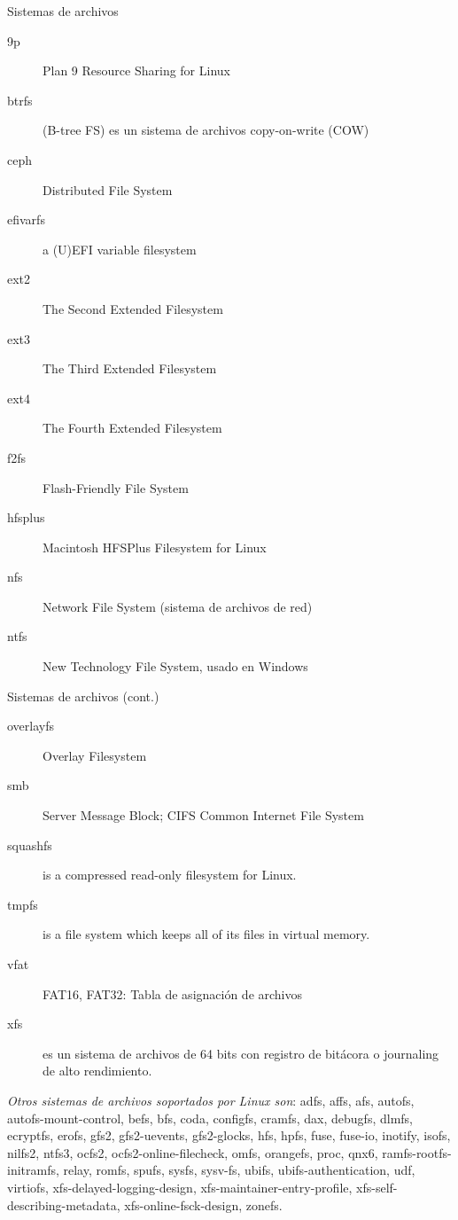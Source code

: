 \begin{frame}[c]{Sistemas de archivos}
  \pausa
  \begin{description}
    \item[9p] Plan 9 Resource Sharing for Linux
    \pausa
    \item[btrfs] (B-tree FS) es un sistema de archivos copy-on-write (COW) 
    \pausa
    \item[ceph] Distributed File System
    \pausa
    \item[efivarfs] a (U)EFI variable filesystem
    \pausa
    \item[ext2] The Second Extended Filesystem
    \pausa
    \item[ext3] The Third Extended Filesystem
    \pausa
    \item[ext4] The Fourth Extended Filesystem
    \pausa
    \item[f2fs] Flash-Friendly File System
    \pausa
    \item[hfsplus] Macintosh HFSPlus Filesystem for Linux
    \pausa
    \item[nfs] Network File System (sistema de archivos de red)
    \pausa
    \item[ntfs] New Technology File System, usado en Windows
  \end{description}
\end{frame}

\begin{frame}[c]{Sistemas de archivos (cont.)}
  \begin{description}
    \item[overlayfs] Overlay Filesystem
    \pausa
    \item[smb] Server Message Block; CIFS Common Internet File System
    \pausa
    \item[squashfs] is a compressed read-only filesystem for Linux.
    \pausa
    \item[tmpfs] is a file system which keeps all of its files in virtual memory.
    \pausa
    \item[vfat] FAT16, FAT32: Tabla de asignación de archivos
    \pausa
    \item[xfs]  es un sistema de archivos de 64 bits con registro de
      bitácora o journaling de alto rendimiento.
  \end{description}

  \vspace{\baselineskip}
   \emph{Otros sistemas de archivos soportados por Linux son}: adfs, affs, afs,
   autofs, autofs-mount-control, befs, bfs, coda, configfs, cramfs, dax,
   debugfs, dlmfs, ecryptfs, erofs, gfs2, gfs2-uevents, gfs2-glocks, hfs,
   hpfs, fuse, fuse-io, inotify, isofs, nilfs2, ntfs3, ocfs2,
   ocfs2-online-filecheck, omfs, orangefs, proc, qnx6, ramfs-rootfs-initramfs,
   relay, romfs, spufs, sysfs, sysv-fs, ubifs, ubifs-authentication, udf,
   virtiofs, xfs-delayed-logging-design, xfs-maintainer-entry-profile,
   xfs-self-describing-metadata, xfs-online-fsck-design, zonefs.
\end{frame}

